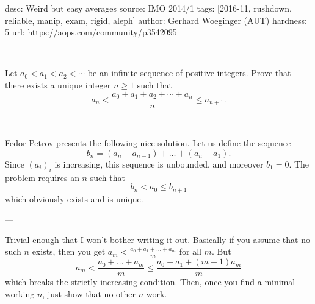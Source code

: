 desc: Weird but easy averages
source: IMO 2014/1
tags: [2016-11, rushdown, reliable, manip, exam, rigid, aleph]
author: Gerhard Woeginger (AUT)
hardness: 5
url: https://aops.com/community/p3542095

---

Let $a_0 < a_1 < a_2 < \dotsb$ be an infinite sequence of positive integers.
Prove that there exists a unique integer $n\geq 1$ such that
\[ a_n < \frac{a_0+a_1+a_2+\dotsb+a_n}{n} \le a_{n+1}. \]

---

Fedor Petrov presents the following nice solution.
Let us define the sequence
\[ b_n = \left( a_n - a_{n-1} \right) + \dots
  + \left( a_n - a_1 \right). \]
Since $(a_i)_i$ is increasing,
this sequence is unbounded, and moreover $b_1 = 0$.
The problem requires an $n$ such that
\[ b_n < a_0 \le b_{n+1} \]
which obviously exists and is unique.

---

Trivial enough that I won't bother writing it out.
Basically if you assume that no such $n$ exists, then you get $a_m < \frac{a_0+a_1+ \dots + a_m}{m}$ for all $m$. But
\[ a_m < \frac{a_0+ \dots + a_m}{m} \le \frac{a_0+a_1 + (m-1)a_m}{m} \]
which breaks the strictly increasing condition.
Then, once you find a minimal working $n$, just show that no other $n$ work.
